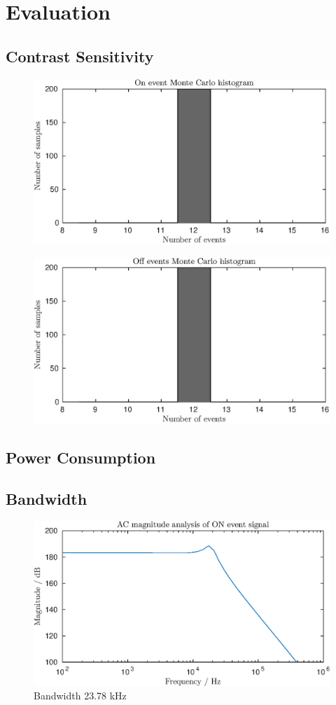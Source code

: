 \section{Evaluation}
\subsection{Contrast Sensitivity}
\begin{figure}
    \center
    \includegraphics{pre-on-200-MC.eps}
    \caption{}
    \label{}
\end{figure}
\begin{figure}
    \center
    \includegraphics{pre-off-200-MC.eps}
    \caption{}
    \label{}
\end{figure}
\subsection{Power Consumption}
\subsection{Bandwidth}
\begin{figure}
    \center
    \includegraphics{pixel-bode.eps}
    \caption{Bandwidth 23.78 kHz}
    \label{}
\end{figure}
